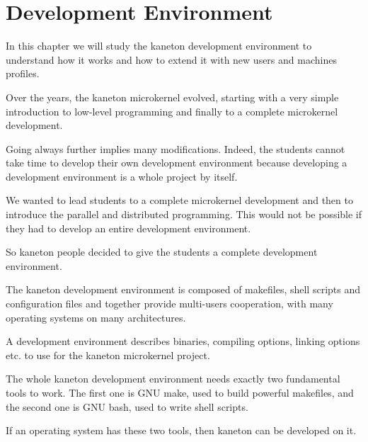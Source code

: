 
%
%

\chapter{Development Environment}

In this chapter we will study the kaneton development environment
to understand how it works and how to extend it with new users and
machines profiles.

\newpage

%
%

Over the years, the kaneton microkernel evolved, starting with a
very simple introduction to low-level programming and finally
to a complete microkernel development.

Going always further implies many modifications. Indeed, the students
cannot take time to develop their own development environment because
developing a development environment is a whole project by itself.

We wanted to lead students to a complete microkernel development and then
to introduce the parallel and distributed programming. This would not
be possible if they had to develop an entire development environment.

So kaneton people decided to give the students a complete development
environment.

The kaneton development environment is composed of makefiles, shell
scripts and configuration files and together provide multi-users cooperation,
with many operating systems on many architectures.

A development environment describes binaries, compiling options, linking
options etc. to use for the kaneton microkernel project.

The whole kaneton development environment needs exactly two
fundamental tools to work. The first one is GNU make, used to build
powerful makefiles, and the second one is GNU bash, used to write
shell scripts.

If an operating system has these two tools, then kaneton can be developed
on it.

%
%

